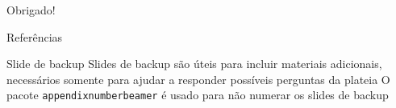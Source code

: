 \documentclass{beamer}
\begin{document}
    \begin{frame}[focus]
        Obrigado!
    \end{frame}
    
    \appendix
    \begin{frame}{Referências}
        \nocite{*}
        
        
    \end{frame}
    
    \begin{frame}{Slide de backup}
        Slides de backup são úteis para incluir materiais adicionais, necessários somente para ajudar a responder possíveis perguntas da plateia
        \vfill
        O pacote \texttt{appendixnumberbeamer} é usado para não numerar os slides de backup
    \end{frame}
\end{document}
